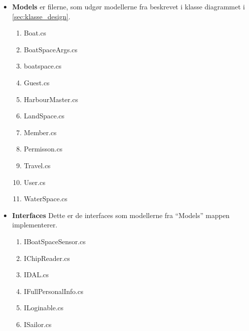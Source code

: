 \begin{itemize}
	\item \textbf{Models} er filerne, som udgør modellerne fra beskrevet i klasse diagrammet i \cref{sec:klasse_design}.
		\begin{enumerate}
			\item Boat.cs
			\item BoatSpaceArgs.cs
			\item boatspace.cs
			\item Guest.cs
			\item HarbourMaster.cs
			\item LandSpace.cs
			\item Member.cs
			\item Permisson.cs
			\item Travel.cs
			\item User.cs
			\item WaterSpace.cs

		\end{enumerate}
\end{itemize}


\begin{itemize}
	\item \textbf{Interfaces} Dette er de interfaces som modellerne fra \enquote{Models} mappen implementerer.
		\begin{enumerate}
			\item IBoatSpaceSensor.cs
			\item IChipReader.cs
			\item IDAL.cs
			\item IFullPersonalInfo.cs
			\item ILoginable.cs
			\item ISailor.cs
		\end{enumerate}
\end{itemize}

